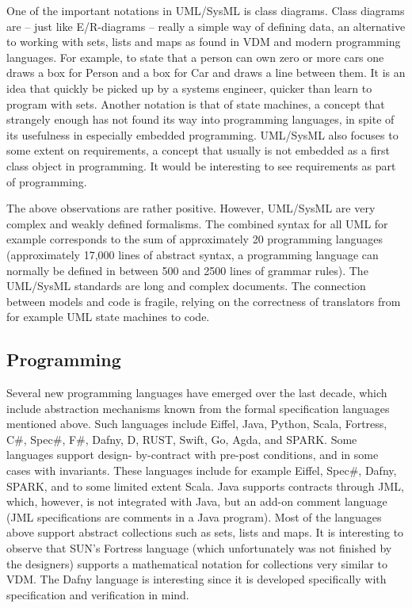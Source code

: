 One of the important notations in UML/SysML is class diagrams. 
Class diagrams are – just like E/R-diagrams – really a simple way 
of defining data, an alternative to working with sets, lists and 
maps as found in VDM and modern programming languages. For example, 
to state that a person can own zero or more cars one draws a box 
for Person and a box for Car and draws a line between them. It is 
an idea that quickly be picked up by a systems engineer, quicker 
than learn to program with sets. Another notation is that of state 
machines, a concept that strangely enough has not found its way 
into programming languages, in spite of its usefulness in 
especially embedded programming. UML/SysML also focuses to some 
extent on requirements, a concept that usually is not embedded as a 
first class object in programming. It would be interesting to see 
requirements as part of programming.

The above observations are rather positive. However, UML/SysML are 
very complex and weakly defined formalisms. The combined syntax for 
all UML for example corresponds to the sum of approximately 20 
programming languages (approximately 17,000 lines of abstract 
syntax, a programming language can normally be defined in between 
500 and 2500 lines of grammar rules). The UML/SysML standards are 
long and complex documents. The connection between models and code 
is fragile, relying on the correctness of translators from for 
example UML state machines to code. 


\subsection{Programming}

Several new programming languages have emerged over the last 
decade, which include abstraction mechanisms known from the formal 
specification languages mentioned above. Such languages include 
Eiffel, Java, Python, Scala, Fortress,  C\#, Spec\#, F\#,  Dafny, D, 
RUST, Swift, Go, Agda, and SPARK.  Some languages support design-
by-contract with pre-post conditions, and in some cases with 
invariants. These languages  include for example Eiffel, Spec\#, 
Dafny, SPARK, and to some limited extent Scala. Java supports 
contracts through JML, which, however, is not integrated with Java, 
but an add-on comment language (JML specifications are comments in 
a Java program). Most of the languages above support abstract 
collections such as sets, lists and maps. It is interesting to 
observe that SUN’s Fortress language (which unfortunately was not 
finished by the designers) supports a mathematical notation for 
collections very similar to VDM. The Dafny language is interesting 
since it is developed specifically with specification and 
verification in mind.

